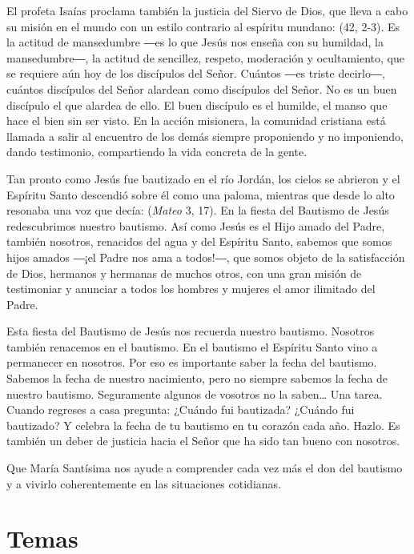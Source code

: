 \begin{body}
\begin{body}
{El profeta Isaías proclama también la justicia del Siervo de Dios, que lleva a cabo su misión en el mundo con un estilo contrario al espíritu mundano:  (42, 2-3). Es la actitud de mansedumbre ―es lo que Jesús nos enseña con su humildad, la mansedumbre―, la actitud de sencillez, respeto, moderación y ocultamiento, que se requiere aún hoy de los discípulos del Señor. Cuántos ―es triste decirlo―, cuántos discípulos del Señor alardean como discípulos del Señor. No es un buen discípulo el que alardea de ello. El buen discípulo es el humilde, el manso que hace el bien sin ser visto. En la acción misionera, la comunidad cristiana está llamada a salir al encuentro de los demás siempre proponiendo y no imponiendo, dando testimonio, compartiendo la vida concreta de la gente.

Tan pronto como Jesús fue bautizado en el río Jordán, los cielos se abrieron y el Espíritu Santo descendió sobre él como una paloma, mientras que desde lo alto resonaba una voz que decía:  (\emph{Mateo} 3, 17). En la fiesta del Bautismo de Jesús redescubrimos nuestro bautismo. Así como Jesús es el Hijo amado del Padre, también nosotros, renacidos del agua y del Espíritu Santo, sabemos que somos hijos amados ―¡el Padre nos ama a todos!―, que somos objeto de la satisfacción de Dios, hermanos y hermanas de muchos otros, con una gran misión de testimoniar y anunciar a todos los hombres y mujeres el amor ilimitado del Padre.

Esta fiesta del Bautismo de Jesús nos recuerda nuestro bautismo. Nosotros también renacemos en el bautismo. En el bautismo el Espíritu Santo vino a permanecer en nosotros. Por eso es importante saber la fecha del bautismo. Sabemos la fecha de nuestro nacimiento, pero no siempre sabemos la fecha de nuestro bautismo. Seguramente algunos de vosotros no la saben\ldots{} Una tarea. Cuando regreses a casa pregunta: ¿Cuándo fui bautizada? ¿Cuándo fui bautizado? Y celebra la fecha de tu bautismo en tu corazón cada año. Hazlo. Es también un deber de justicia hacia el Señor que ha sido tan bueno con nosotros.

Que María Santísima nos ayude a comprender cada vez más el don del bautismo y a vivirlo coherentemente en las situaciones cotidianas.

\section{Temas}

}
\end{body}
\end{body}

